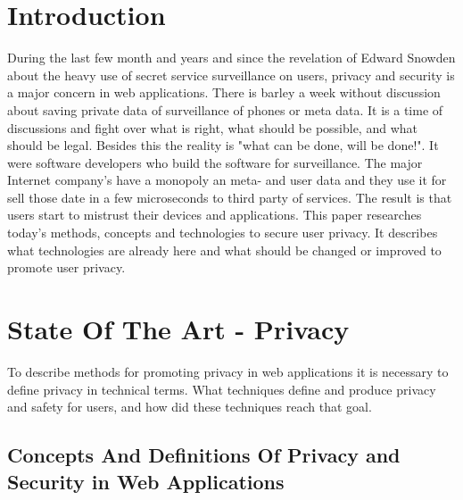 \section{Introduction}
During the last few month and years and since the revelation of Edward Snowden about the heavy use of secret service surveillance on users, privacy and security is a major concern in web applications. There is barley a week without discussion about saving private data of surveillance of phones or meta data. It is a time of discussions and fight over what is right, what should be possible, and what should be legal. Besides this the reality is "what can be done, will be done!". It were software developers who build the software for surveillance. The major Internet company's have a monopoly an meta- and user data and they use it for sell those date in a few microseconds to third party of services. The result is that users start to mistrust their devices and applications. This paper researches today's methods, concepts and technologies to secure user privacy. It describes what technologies are already here and what should be changed or improved to promote user privacy.

\newpage

\section{State Of The Art - Privacy}
\label{section:Introduction}
To describe methods for promoting privacy in web applications it is necessary to define privacy in technical terms. What techniques define and produce privacy and safety for users, and how did these techniques reach that goal.

\subsection{Concepts And Definitions Of Privacy and Security in Web Applications}

